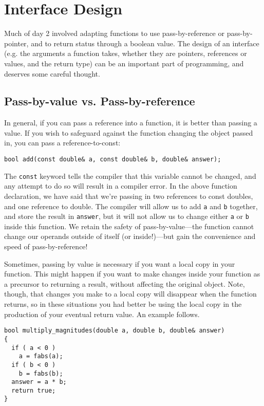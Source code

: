 \documentclass[a4paper]{scrartcl}
\begin{document}
\section{Interface Design}
Much of day 2 involved adapting functions to use pass-by-reference or pass-by-pointer, and to return status through a boolean value. The design of an interface (e.g. the arguments a function takes, whether they are pointers, references or values, and the return type) can be an important part of programming, and deserves some careful thought.

\subsection{Pass-by-value vs. Pass-by-reference}
In general, if you can pass a reference into a function, it is better than passing a value. If you wish to safeguard against the function changing the object passed in, you can pass a reference-to-const:
\begin{verbatim}
bool add(const double& a, const double& b, double& answer);
\end{verbatim}

The \texttt{const} keyword tells the compiler that this variable cannot be changed, and any attempt to do so will result in a compiler error. In the above function declaration, we have said that we're passing in two references to const doubles, and one reference to double. The compiler will allow us to add \verb|a| and \verb|b| together, and store the result in \verb|answer|, but it will not allow us to change either \verb|a| or \verb|b| inside this function. We retain the safety of pass-by-value---the function cannot change our operands outside of itself (or inside!)---but gain the convenience and speed of pass-by-reference!

Sometimes, passing by value is necessary if you want a local copy in your function. This might happen if you want to make changes inside your function as a precursor to returning a result, without affecting the original object. Note, though, that changes you make to a local copy will disappear when the function returns, so in these situations you had better be using the local copy in the production of your eventual return value. An example follows.
\begin{verbatim}
bool multiply_magnitudes(double a, double b, double& answer)
{
  if ( a < 0 )
    a = fabs(a);
  if ( b < 0 )
    b = fabs(b);
  answer = a * b;
  return true;
}
\end{verbatim}
\end{document}
